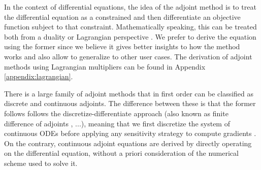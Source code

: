 In the context of differential equations, the idea of the adjoint method is to treat the differential equation as a constrained and then differentiate an objective function subject to that constraint. 
Mathematically speaking, this can be treated both from a duality or Lagrangian perspective \cite{Giles_Pierce_2000}.
We prefer to derive the equation using the former since we believe it gives better insights to how the method works and also allow to generalize to other user cases. 
The derivation of adjoint methods using Lagrangian multipliers can be found in Appendix \ref{appendix:lagrangian}.

There is a large family of adjoint methods that in first order can be classified as discrete and continuous adjoints. 
The difference between these is that the former follows follows the discretize-differentiate approach (also known as finite difference of adjoints \cite{Sirkes_Tziperman_1997}, ...), meaning that we first discretize the system of continuous ODEs before applying any sensitivity strategy to compute gradients \cite{Giles_Pierce_2000, allaire2015review}. 
On the contrary, continuous adjoint equations are derived by directly operating on the differential equation, without a priori consideration of the numerical scheme used to solve it. 
